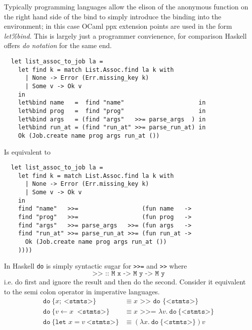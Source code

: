 Typically programming languages allow the elison of the anonymous function on the right hand side
of the bind to simply introduce the binding into the environment;
in this case OCaml ppx extension points are used in the form \textit{let\%bind}.
This is largely just a programmer convienence,
for comparison Haskell offers \textit{do notation} for the same end.

\begin{verbatim}
  let list_assoc_to_job la =
    let find k = match List.Assoc.find la k with
      | None -> Error (Err.missing_key k)
      | Some v -> Ok v
    in
    let%bind name   =  find "name"                     in
    let%bind prog   =  find "prog"                     in
    let%bind args   = (find "args"   >>= parse_args  ) in
    let%bind run_at = (find "run_at" >>= parse_run_at) in
    Ok (Job.create name prog args run_at ())
\end{verbatim}
Is equivalent to
\begin{verbatim}
  let list_assoc_to_job la =
    let find k = match List.Assoc.find la k with
      | None -> Error (Err.missing_key k)
      | Some v -> Ok v
    in
    find "name"   >>=                  (fun name   ->
    find "prog"   >>=                  (fun prog   ->
    find "args"   >>= parse_args   >>= (fun args   ->
    find "run_at" >>= parse_run_at >>= (fun run_at ->
      Ok (Job.create name prog args run_at ())
    ))))
\end{verbatim}

In Haskell \texttt{do} is simply syntactic sugar for \texttt{>>=} and \texttt{>>} where
\begin{equation}
    \texttt{>> :: M x -> M y -> M y}
\end{equation}
i.e. do first and ignore the result and then do the second.
Consider it equivalent to the semi colon operator in imperative languages.
\begin{align}
    \texttt{do}\ \{ x;\ \texttt{<stmts>} \}
    &\equiv x \texttt{ >> do \{<stmts>\}}
    \\
    \texttt{do}\ \{ v \leftarrow x\ \texttt{ <stmts>}\}
    &\equiv x \texttt{ >>= } \lambda v.\ \texttt{do}\ \{ \texttt{<stmts>} \}
    \\
    \texttt{do}\ \{\texttt{let }x = v\ \texttt{<stmts>}\}
    &\equiv (\lambda x.\ \texttt{do}\ \{ \texttt{<stmts>} \})v
\end{align}

